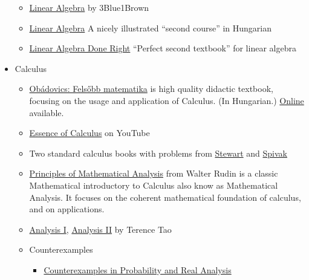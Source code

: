 \documentclass{article}
\begin{document}
\begin{itemize}
\begin{itemize}
        \item \href{https://www.youtube.com/playlist?list=PLZHQObOWTQDPD3MizzM2xVFitgF8hE_ab}{Linear Algebra} by 3Blue1Brown
        
        
        \item \href{https://web.archive.org/web/20160717031653/http://tankonyvtar.ttk.bme.hu/pdf/14.pdf}{Linear Algebra} A nicely illustrated ``second course'' in Hungarian
        
        \item \href{https://www.goodreads.com/book/show/309768.Linear_Algebra_Done_Right}{Linear Algebra Done Right} ``Perfect second textbook'' for linear algebra
    \end{itemize}
    
    \item Calculus
    \begin{itemize}
        \item \href{https://moly.hu/konyvek/obadovics-j-gyula-szarka-zoltan-felsobb-matematika}{Obádovics: Felsőbb matematika} is high quality didactic textbook, focusing on the usage and application of Calculus. (In Hungarian.) \href{https://www.scribd.com/doc/96616339/Obadovics-J-Gyula-Fels\%C5\%91bb-matematika}{Online} available.
        
        \item \href{https://www.youtube.com/watch?v=WUvTyaaNkzM&list=PLZHQObOWTQDMsr9K-rj53DwVRMYO3t5Yr}{Essence of Calculus} on YouTube
        
        \item Two standard calculus books with problems from \href{https://www.goodreads.com/book/show/61298.Calculus}{Stewart} and \href{https://www.goodreads.com/book/show/328645.Calculus}{Spivak}
        
        \item \href{https://www.goodreads.com/book/show/292079.Principles_of_Mathematical_Analysis}{Principles of Mathematical Analysis} from Walter Rudin is a classic Mathematical introductory to Calculus also know as Mathematical Analysis. It focuses on the coherent mathematical foundation of calculus, and on applications.
        
        \item \href{https://www.goodreads.com/book/show/502785.Analysis_I}{Analysis I}, \href{https://www.goodreads.com/book/show/2578776-analysis-ii}{Analysis II} by Terence Tao
        
        \item Counterexamples
            \begin{itemize}
            \item \href{https://www.goodreads.com/book/show/1402795.Counterexamples_in_Probability_and_Real_Analysis}{Counterexamples in Probability and Real Analysis}
        

\end{itemize}
\end{itemize}
\end{itemize}
\end{document}
